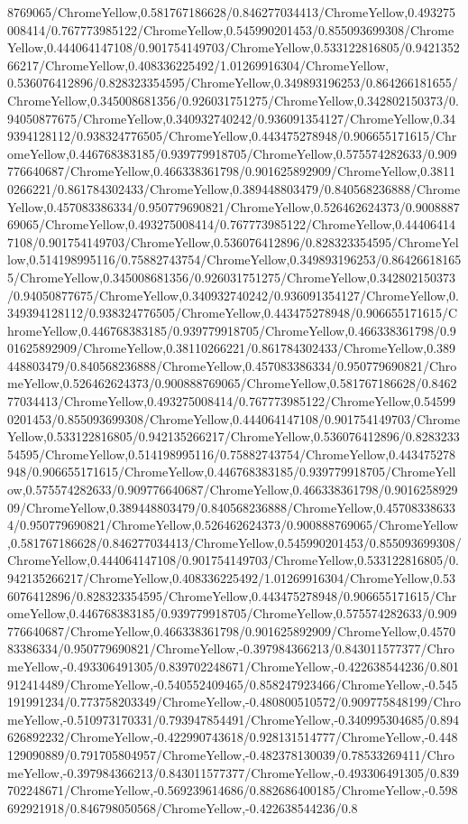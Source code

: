 {\begin{tikzternal}
{8769065/ChromeYellow,0.581767186628/0.846277034413/ChromeYellow,0.493275008414/0.767773985122/ChromeYellow,0.545990201453/0.855093699308/ChromeYellow,0.444064147108/0.901754149703/ChromeYellow,0.533122816805/0.942135266217/ChromeYellow,0.408336225492/1.01269916304/ChromeYellow,
0.536076412896/0.828323354595/ChromeYellow,0.349893196253/0.864266181655/ChromeYellow,0.345008681356/0.926031751275/ChromeYellow,0.342802150373/0.94050877675/ChromeYellow,0.340932740242/0.936091354127/ChromeYellow,0.349394128112/0.938324776505/ChromeYellow,0.443475278948/0.906655171615/ChromeYellow,0.446768383185/0.939779918705/ChromeYellow,0.575574282633/0.909776640687/ChromeYellow,0.466338361798/0.901625892909/ChromeYellow,0.38110266221/0.861784302433/ChromeYellow,0.389448803479/0.840568236888/ChromeYellow,0.457083386334/0.950779690821/ChromeYellow,0.526462624373/0.900888769065/ChromeYellow,0.493275008414/0.767773985122/ChromeYellow,0.444064147108/0.901754149703/ChromeYellow,0.536076412896/0.828323354595/ChromeYellow,0.514198995116/0.75882743754/ChromeYellow,0.349893196253/0.864266181655/ChromeYellow,0.345008681356/0.926031751275/ChromeYellow,0.342802150373/0.94050877675/ChromeYellow,0.340932740242/0.936091354127/ChromeYellow,0.349394128112/0.938324776505/ChromeYellow,0.443475278948/0.906655171615/ChromeYellow,0.446768383185/0.939779918705/ChromeYellow,0.466338361798/0.901625892909/ChromeYellow,0.38110266221/0.861784302433/ChromeYellow,0.389448803479/0.840568236888/ChromeYellow,0.457083386334/0.950779690821/ChromeYellow,0.526462624373/0.900888769065/ChromeYellow,0.581767186628/0.846277034413/ChromeYellow,0.493275008414/0.767773985122/ChromeYellow,0.545990201453/0.855093699308/ChromeYellow,0.444064147108/0.901754149703/ChromeYellow,0.533122816805/0.942135266217/ChromeYellow,0.536076412896/0.828323354595/ChromeYellow,0.514198995116/0.75882743754/ChromeYellow,0.443475278948/0.906655171615/ChromeYellow,0.446768383185/0.939779918705/ChromeYellow,0.575574282633/0.909776640687/ChromeYellow,0.466338361798/0.901625892909/ChromeYellow,0.389448803479/0.840568236888/ChromeYellow,0.457083386334/0.950779690821/ChromeYellow,0.526462624373/0.900888769065/ChromeYellow,0.581767186628/0.846277034413/ChromeYellow,0.545990201453/0.855093699308/ChromeYellow,0.444064147108/0.901754149703/ChromeYellow,0.533122816805/0.942135266217/ChromeYellow,0.408336225492/1.01269916304/ChromeYellow,0.536076412896/0.828323354595/ChromeYellow,0.443475278948/0.906655171615/ChromeYellow,0.446768383185/0.939779918705/ChromeYellow,0.575574282633/0.909776640687/ChromeYellow,0.466338361798/0.901625892909/ChromeYellow,0.457083386334/0.950779690821/ChromeYellow,-0.397984366213/0.843011577377/ChromeYellow,-0.493306491305/0.839702248671/ChromeYellow,-0.422638544236/0.801912414489/ChromeYellow,-0.540552409465/0.858247923466/ChromeYellow,-0.545191991234/0.773758203349/ChromeYellow,-0.480800510572/0.909775848199/ChromeYellow,-0.510973170331/0.793947854491/ChromeYellow,-0.340995304685/0.894626892232/ChromeYellow,-0.422990743618/0.928131514777/ChromeYellow,-0.448129090889/0.791705804957/ChromeYellow,-0.482378130039/0.78533269411/ChromeYellow,-0.397984366213/0.843011577377/ChromeYellow,-0.493306491305/0.839702248671/ChromeYellow,-0.569239614686/0.882686400185/ChromeYellow,-0.598692921918/0.846798050568/ChromeYellow,-0.422638544236/0.8}
\end{tikzternal}}
